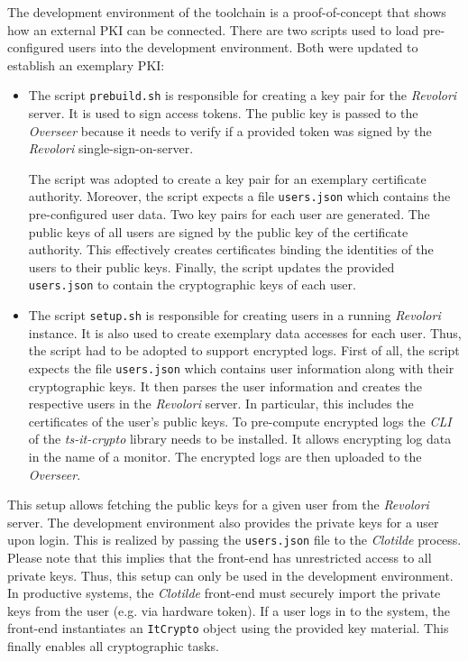 \documentclass[../main.tex]{subfiles}
\begin{document}
The development environment of the toolchain is a proof-of-concept that shows how an external PKI can be connected.
There are two scripts used to load pre-configured users into the development environment.
Both were updated to establish an exemplary PKI:

\begin{itemize}
    \item 
    The script \verb|prebuild.sh| is responsible for creating a key pair for the \emph{Revolori} server.
    It is used to sign access tokens.
    The public key is passed to the \emph{Overseer} because it needs to verify if a provided token was signed by the \emph{Revolori} single-sign-on-server.
    
    The script was adopted to create a key pair for an exemplary certificate authority.
    Moreover, the script expects a file \verb|users.json| which contains the pre-configured user data.
    Two key pairs for each user are generated.
    The public keys of all users are signed by the public key of the certificate authority.
    This effectively creates certificates binding the identities of the users to their public keys.
    Finally, the script updates the provided \verb|users.json| to contain the cryptographic keys of each user.
    \item 
    The script \verb|setup.sh| is responsible for creating users in a running \emph{Revolori} instance.
    It is also used to create exemplary data accesses for each user.
    Thus, the script had to be adopted to support encrypted logs.
    First of all, the script expects the file \verb|users.json| which contains user information along with their cryptographic keys.
    It then parses the user information and creates the respective users in the \emph{Revolori} server.
    In particular, this includes the certificates of the user's public keys.
    To pre-compute encrypted logs the \emph{CLI} of the \emph{ts-it-crypto} library needs to be installed.
    It allows encrypting log data in the name of a monitor.
    The encrypted logs are then uploaded to the \emph{Overseer}.

\end{itemize}

This setup allows fetching the public keys for a given user from the \emph{Revolori} server.
The development environment also provides the private keys for a user upon login.
This is realized by passing the \verb|users.json| file to the \emph{Clotilde} process.
Please note that this implies that the front-end has unrestricted access to all private keys.
Thus, this setup can only be used in the development environment.
In productive systems, the \emph{Clotilde} front-end must securely import the private keys from the user (e.g. via hardware token).
If a user logs in to the system, the front-end instantiates an \verb|ItCrypto| object using the provided key material.
This finally enables all cryptographic tasks.
\end{document}
